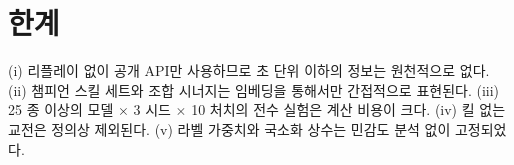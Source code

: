 
\section{한계}
\label{sec:disc-limitations}

(i) 리플레이 없이 공개 API만 사용하므로 초 단위 이하의 정보는 원천적으로 없다. (ii) 챔피언 스킬 세트와 조합 시너지는 임베딩을 통해서만 간접적으로 표현된다. (iii) 25 종 이상의 모델 $\times$ 3 시드 $\times$ 10 처치의 전수 실험은 계산 비용이 크다. (iv) 킬 없는 교전은 정의상 제외된다. (v) 라벨 가중치와 국소화 상수는 민감도 분석 없이 고정되었다.
